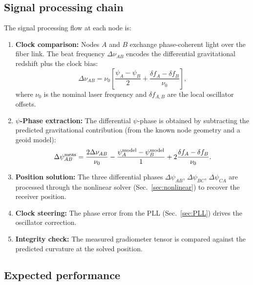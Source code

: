 \documentclass[aps,prd,twocolumn,superscriptaddress,nofootinbib]{revtex4-2}
\begin{document}
\subsection{Signal processing chain}\label{sec:signal-chain}

The signal processing flow at each node is:

\begin{enumerate}
\item \textbf{Clock comparison:} Nodes $A$ and $B$ exchange
phase-coherent light over the fiber link. The beat frequency
$\Delta\nu_{AB}$ encodes the differential gravitational redshift
plus the clock bias:
\begin{equation}\label{eq:beat}
\Delta\nu_{AB} = \nu_0\left[\frac{\psi_A - \psi_B}{2}
+ \frac{\delta f_A - \delta f_B}{\nu_0}\right],
\end{equation}
where $\nu_0$ is the nominal laser frequency and $\delta f_{A,B}$
are the local oscillator offsets.

\item \textbf{$\psi$-Phase extraction:} The differential $\psi$-phase
is obtained by subtracting the predicted gravitational contribution
(from the known node geometry and a geoid model):
\begin{equation}\label{eq:phase-extract}
\Delta\psi_{AB}^{\rm meas} = \frac{2\Delta\nu_{AB}}{\nu_0}
- \frac{\psi_A^{\rm model} - \psi_B^{\rm model}}{1}
+ 2\frac{\delta f_A - \delta f_B}{\nu_0}.
\end{equation}

\item \textbf{Position solution:} The three differential phases
$\Delta\psi_{AB}$, $\Delta\psi_{BC}$, $\Delta\psi_{CA}$ are
processed through the nonlinear solver
(Sec.~\ref{sec:nonlinear}) to recover the receiver position.

\item \textbf{Clock steering:} The phase error from the PLL
(Sec.~\ref{sec:PLL}) drives the oscillator correction.

\item \textbf{Integrity check:} The measured gradiometer tensor
is compared against the predicted curvature at the solved position.
\end{enumerate}

\subsection{Expected performance}\label{sec:expected-perf}
\end{document}
